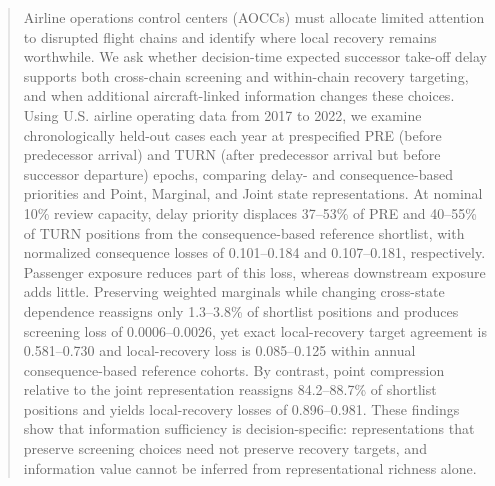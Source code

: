 \begin{abstract}
Airline operations control centers (AOCCs) must allocate limited attention to disrupted flight chains and identify where local recovery remains worthwhile. We ask whether decision-time expected successor take-off delay supports both cross-chain screening and within-chain recovery targeting, and when additional aircraft-linked information changes these choices. Using U.S. airline operating data from 2017 to 2022, we examine chronologically held-out cases each year at prespecified PRE (before predecessor arrival) and TURN (after predecessor arrival but before successor departure) epochs, comparing delay- and consequence-based priorities and Point, Marginal, and Joint state representations. At nominal 10\% review capacity, delay priority displaces 37--53\% of PRE and 40--55\% of TURN positions from the consequence-based reference shortlist, with normalized consequence losses of 0.101--0.184 and 0.107--0.181, respectively. Passenger exposure reduces part of this loss, whereas downstream exposure adds little. Preserving weighted marginals while changing cross-state dependence reassigns only 1.3--3.8\% of shortlist positions and produces screening loss of 0.0006--0.0026, yet exact local-recovery target agreement is 0.581--0.730 and local-recovery loss is 0.085--0.125 within annual consequence-based reference cohorts. By contrast, point compression relative to the joint representation reassigns 84.2--88.7\% of shortlist positions and yields local-recovery losses of 0.896--0.981. These findings show that information sufficiency is decision-specific: representations that preserve screening choices need not preserve recovery targets, and information value cannot be inferred from representational richness alone.
\end{abstract}
